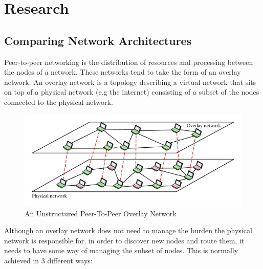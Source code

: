 \documentclass[]{report}
\begin{document}
	\section{Research}
		\subsection*{Comparing Network Architectures}	
			Peer-to-peer networking is the distribution of resources and processing between the nodes of a network. These networks tend to take the form of an overlay network. An overlay network is a topology describing a virtual network that sits on top of a physical network (e.g the internet) consisting of a subset of the nodes connected to the physical network.
			
			\begin{figure}[h]
				\caption{
					An Unstructured Peer-To-Peer Overlay Network 	
					\cite{Unstructured P2P Diagram}
				}
				\centering
				\includegraphics{overlaynetwork.jpg}
			\end{figure}
			
			Although an overlay network does not need to manage the burden the physical network is responsible for, in order to discover new nodes and route them, it needs to have some way of managing the subset of nodes. This is normally achieved in 3 different ways:
			
\end{document}

